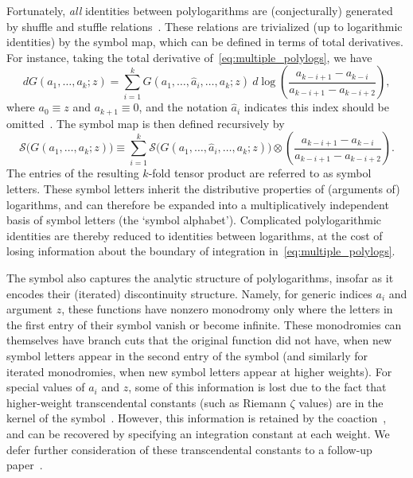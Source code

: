 \documentclass[12pt]{article}
\begin{document}
Fortunately, \emph{all} identities between polylogarithms are (conjecturally) generated by shuffle and stuffle relations~\cite{2011arXiv1102.1312B,2015arXiv151206409B}. These relations are trivialized (up to logarithmic identities) by the symbol map, which can be defined in terms of total derivatives. For instance, taking the total derivative of~\eqref{eq:multiple_polylogs}, we have
\begin{equation} \label{eq:symbol_def}
d G(a_1, \dots, a_k; z) = \sum_{i=1}^{k} G(a_1,\dots,\hat{a}_i,\dots,a_k; z)\ d\log \left( \frac{a_{k-i+1} - a_{k-i}}{a_{k-i+1} - a_{k-i+2}} \right),
\end{equation} 
where $a_0 \equiv z$ and $a_{k+1} \equiv 0$, and the notation $\hat{a}_i$ indicates this index should be omitted~\cite{GoncharovMixedTate}. The symbol map is then defined recursively by~\cite{Goncharov:2010jf}
\begin{equation} \label{eq:symbol_def}
\mathcal{S}\big(G(a_1, \dots, a_k; z)\big) \equiv \sum_{i=1}^{k} \mathcal{S}\big(G(a_1,\dots,\hat{a}_i,\dots,a_k; z) \big) \otimes \left( \frac{a_{k-i+1} - a_{k-i}}{a_{k-i+1} - a_{k-i+2}} \right).
\end{equation} 
The entries of the resulting $k$-fold tensor product are referred to as symbol letters. These symbol letters inherit the distributive properties of (arguments of) logarithms, and can therefore be expanded into a multiplicatively independent basis of symbol letters (the `symbol alphabet'). Complicated polylogarithmic identities are thereby reduced to identities between logarithms, at the cost of losing information about the boundary of integration in~\eqref{eq:multiple_polylogs}.
 
The symbol also captures the analytic structure of polylogarithms, insofar as it encodes their (iterated) discontinuity structure. Namely, for generic indices $a_i$ and argument $z$, these functions have nonzero monodromy only where the letters in the first entry of their symbol vanish or become infinite. These monodromies can themselves have branch cuts that the original function did not have, when new symbol letters appear in the second entry of the symbol (and similarly for iterated monodromies, when new symbol letters appear at higher weights). For special values of $a_i$ and $z$, some of this information is lost due to the fact that higher-weight transcendental constants (such as Riemann $\zeta$ values) are in the kernel of the symbol~\cite{Gonch}. However, this information is retained by the coaction~\cite{Brown:2011ik,Duhr:2012fh}, and can be recovered by specifying an integration constant at each weight. We defer further consideration of these transcendental constants to a follow-up paper~\cite{cluster_subalgebras_ii}.
\end{document}
